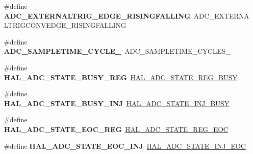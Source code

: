 \begin{DoxyCompactItemize}
\mbox{\label{group___h_a_l___a_d_c___aliased___defines_gaa0c1b4c780d8091fd60f2624ceb2f3a4}} 
\#define {\bfseries A\+D\+C\+\_\+\+E\+X\+T\+E\+R\+N\+A\+L\+T\+R\+I\+G\+\_\+\+E\+D\+G\+E\+\_\+\+R\+I\+S\+I\+N\+G\+F\+A\+L\+L\+I\+NG}~A\+D\+C\+\_\+\+E\+X\+T\+E\+R\+N\+A\+L\+T\+R\+I\+G\+C\+O\+N\+V\+E\+D\+G\+E\+\_\+\+R\+I\+S\+I\+N\+G\+F\+A\+L\+L\+I\+NG
\item 
\mbox{\label{group___h_a_l___a_d_c___aliased___defines_ga5a51fc2613e4af9bd780b00878393cc0}} 
\#define {\bfseries A\+D\+C\+\_\+\+S\+A\+M\+P\+L\+E\+T\+I\+M\+E\+\_\+C\+Y\+C\+L\+E\+\_}~A\+D\+C\+\_\+\+S\+A\+M\+P\+L\+E\+T\+I\+M\+E\+\_\+C\+Y\+C\+L\+E\+S\+\_
\item 
\mbox{\label{group___h_a_l___a_d_c___aliased___defines_ga3bfd5015d60e3116e55ff81e6627f041}} 
\#define {\bfseries H\+A\+L\+\_\+\+A\+D\+C\+\_\+\+S\+T\+A\+T\+E\+\_\+\+B\+U\+S\+Y\+\_\+\+R\+EG}~\hyperlink{group___a_d_c___exported___types_ga516d4b4ebc261c241c69d96aae19acc3}{H\+A\+L\+\_\+\+A\+D\+C\+\_\+\+S\+T\+A\+T\+E\+\_\+\+R\+E\+G\+\_\+\+B\+U\+SY}
\item 
\mbox{\label{group___h_a_l___a_d_c___aliased___defines_ga9dc7360fd46380f3149e09780cd8f4b4}} 
\#define {\bfseries H\+A\+L\+\_\+\+A\+D\+C\+\_\+\+S\+T\+A\+T\+E\+\_\+\+B\+U\+S\+Y\+\_\+\+I\+NJ}~\hyperlink{group___a_d_c___exported___types_ga0044d240de80a70923b5c970d19ba24b}{H\+A\+L\+\_\+\+A\+D\+C\+\_\+\+S\+T\+A\+T\+E\+\_\+\+I\+N\+J\+\_\+\+B\+U\+SY}
\item 
\mbox{\label{group___h_a_l___a_d_c___aliased___defines_ga12555d013385a39ef776f1177420033c}} 
\#define {\bfseries H\+A\+L\+\_\+\+A\+D\+C\+\_\+\+S\+T\+A\+T\+E\+\_\+\+E\+O\+C\+\_\+\+R\+EG}~\hyperlink{group___a_d_c___exported___types_gae2da191bffb720a553a1e39c10929711}{H\+A\+L\+\_\+\+A\+D\+C\+\_\+\+S\+T\+A\+T\+E\+\_\+\+R\+E\+G\+\_\+\+E\+OC}
\item 
\mbox{\label{group___h_a_l___a_d_c___aliased___defines_ga2d1ddc7f0311b8faf6266a3e3c005c28}} 
\#define {\bfseries H\+A\+L\+\_\+\+A\+D\+C\+\_\+\+S\+T\+A\+T\+E\+\_\+\+E\+O\+C\+\_\+\+I\+NJ}~\hyperlink{group___a_d_c___exported___types_gafcfffd11ab8b84d3b0a1ce50ccf821d5}{H\+A\+L\+\_\+\+A\+D\+C\+\_\+\+S\+T\+A\+T\+E\+\_\+\+I\+N\+J\+\_\+\+E\+OC}

\end{DoxyCompactItemize}
